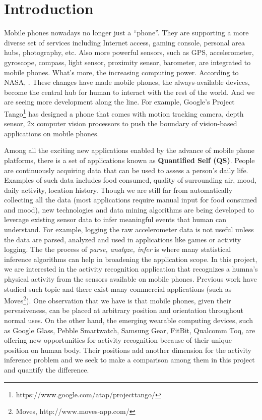 \section{Introduction}
\label{sec:introduction}

Mobile phones nowadays no longer just a ``phone''. They are supporting a more diverse set of services including Internet access, gaming console, personal area hubs, photography, etc. Also more powerful sensors, such as GPS, accelerometer, gyroscope, compass, light sensor, proximity sensor, barometer, are integrated to mobile phones. What's more, the increasing computing power. According to NASA, . These changes have made mobile phones, the always-available devices, become the central hub for human to interact with the rest of the world. And we are seeing more development along the line. For example, Google's Project Tango\footnote{https://www.google.com/atap/projecttango/} has designed a phone that comes with motion tracking camera, depth sensor, 2x computer vision processors to push the boundary of vision-based applications on mobile phones.

Among all the exciting new applications enabled by the advance of mobile phone platforms, there is a set of applications known as {\bf Quantified Self (QS)}\cite{wolf2010quantified}. People are continuously acquiring data that can be used to assess a person's daily life. Examples of such data includes food consumed, quality of surrounding air, mood, daily activity, location history. Though we are still far from automatically collecting all the data (most applications require manual input for food consumed and mood), new technologies and data mining algorithms are being developed to leverage existing sensor data to infer meaningful events that human can understand. For example, logging the raw accelerometer data is not useful unless the data are parsed, analyzed and used in applications like games or activity logging. The the process of {\em parse, analyze, infer} is where many statistical inference algorithms can help in broadening the application scope. In this project, we are interested in the activity recognition application that recognizes a humna's physical activity from the sensors available on mobile phones. Previous work \cite{ravi2005activity, kwapisz2011activity, lee2011activity} have studied such topic and there exist many commercial applications (such as Moves\footnote{Moves, http://www.moves-app.com/}). One observation that we have is that mobile phones, given their pervasiveness, can be placed at arbitrary position and orientation throughout normal uses. On the other hand, the emerging wearable computing devices, such as Google Glass, Pebble Smartwatch, Samsung Gear, FitBit, Qualcomm Toq, are offering new opportunities for activity recognition because of their unique position on human body. Their positions add another dimension for the activity inference problem and we seek to make a comparison among them in this project and quantify the difference.

